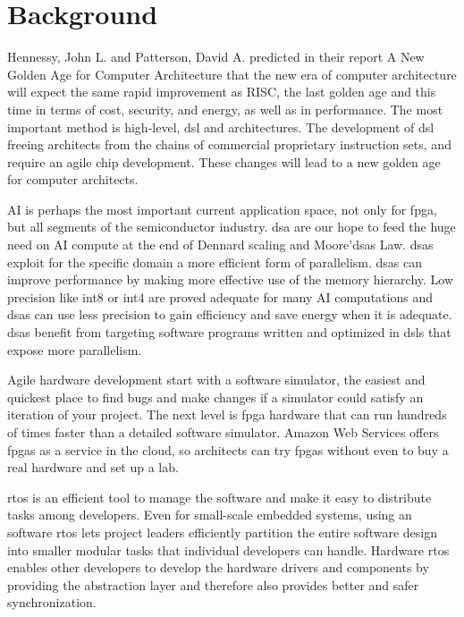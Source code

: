 \chapter{Background}
\label{sec:background}

Hennessy, John L. and Patterson, David A. predicted in their report A New Golden Age for Computer Architecture{\cite{Hennessy2019}} that the new era of computer architecture will expect the same rapid improvement as RISC, the last golden age and this time in terms of cost, security, and energy, as well as in performance. The most important method is high-level, \gls{dsl} and architectures. The development of \gls{dsl} freeing architects from the chains of commercial proprietary instruction sets, and require an agile chip development. These changes will lead to a new golden age for computer architects.

AI is perhaps the most important current application space, not only for \gls{fpga}, but all segments of the semiconductor industry. \gls{dsa} are our hope to feed the huge need on AI compute at the end of Dennard scaling and Moore’\gls{dsa}s Law. \gls{dsa}s exploit for the specific domain a more efficient form of parallelism. \gls{dsa}s can improve performance by making more effective use of the memory hierarchy. Low precision like int8 or int4 are proved adequate for many AI computations and \gls{dsa}s can use less precision to gain efficiency and save energy when it is adequate. \gls{dsa}s benefit from targeting software programs written and optimized in \gls{dsl}s that expose more parallelism.

Agile hardware development start with a software simulator, the easiest and quickest place to find bugs and make changes if a simulator could satisfy an iteration of your project. The next level is  \gls{fpga} hardware that can run hundreds of times faster than a detailed software simulator. Amazon Web Services offers  \gls{fpga}s as a service in the cloud, so architects can try  \gls{fpga}s without even to buy a real hardware and set up a lab.

\gls{rtos} is an efficient tool to manage the software and make it easy to distribute tasks among developers\cite{Stallings2008}. Even for small-scale embedded systems, using an software  \gls{rtos} lets project leaders efficiently partition the entire software design into smaller modular tasks that individual developers can handle. Hardware \gls{rtos} enables other developers to develop the hardware drivers and components by providing the abstraction layer and therefore also provides better and safer synchronization.

